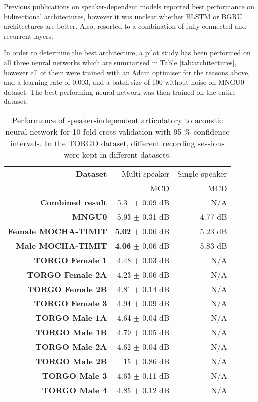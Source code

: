 \documentclass[a4paper]{article}
\begin{document}
Previous publications on speaker-dependent models reported best
performance on bidirectional architectures, however it was unclear whether
BLSTM or BGRU architectures are better. Also, \cite{Taguchi} resorted to
a combination of fully connected and recurrent layers.

In order to determine the best architecture, a pilot study has been
performed on all three neural networks which are summarised in Table \ref{tab:architectures},
however all of them were trained with an Adam optimiser for the reasons above, and a learning rate
of \( 0.003 \), and a batch size of 100 without noise on MNGU0 dataset.
The best performing neural network was then trained on the entire dataset.

\begin{table}[th]
  \caption{Performance of speaker-independent articulatory to acoustic neural network for 10-fold cross-validation with 95 \% confidence intervals. In the TORGO dataset, different recording sessions were
    kept in different datasets. }
  \vspace{1em}
  \label{tab:all_data}
  \centering
  \footnotesize

  \begin{tabular}{ r r r }
    \toprule
    \textbf{Dataset} & Multi-speaker & Single-speaker \\
    & MCD & MCD \\
    \midrule 
    \textbf{Combined result} & 5.31 $\pm$ 0.09 dB & N/A \\  
    \midrule
    \textbf{MNGU0} & 5.93 $\pm$ 0.31 dB & 4.77 dB \\
    \textbf{Female MOCHA-TIMIT} & \textbf{5.02} $\pm$ 0.06 dB  & 5.23 dB \\
    \textbf{Male MOCHA-TIMIT} & \textbf{4.06} $\pm$ 0.06 dB & 5.83 dB \\
    \textbf{TORGO Female 1} & 4.48 $\pm$ 0.03 dB & N/A \\
    \textbf{TORGO Female 2A} & 4.23 $\pm$ 0.06 dB & N/A \\
    \textbf{TORGO Female 2B} & 4.81 $\pm$ 0.14 dB & N/A \\
    \textbf{TORGO Female 3} & 4.94 $\pm$ 0.09 dB & N/A \\
    \textbf{TORGO Male 1A} & 4.64 $\pm$ 0.04 dB & N/A \\
    \textbf{TORGO Male 1B} & 4.70 $\pm$ 0.05 dB & N/A \\
    \textbf{TORGO Male 2A} & 4.62 $\pm$ 0.04 dB & N/A \\
    \textbf{TORGO Male 2B} & 15 $\pm$ 0.86 dB & N/A\\
    \textbf{TORGO Male 3} & 4.63 $\pm$ 0.11 dB & N/A \\
    \textbf{TORGO Male 4} & 4.85 $\pm$ 0.12 dB & N/A \\
    \bottomrule
  \end{tabular}
\end{table}
\end{document}

